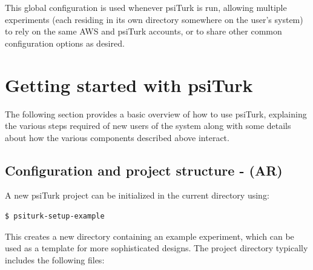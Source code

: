 \documentclass[twocolumn]{svjour3}          %
\begin{document}
This global configuration is used whenever psiTurk is run, allowing multiple experiments (each residing in its own directory somewhere on the user's system) to rely on the same AWS and psiTurk accounts, or to share other common configuration options as desired.



\section{Getting started with \textsf{psiTurk}}

The following section provides a basic overview of how to use psiTurk,
explaining the various steps required of new users of the system along with
some details about how the various components described above interact.

\subsection{Configuration and project structure - (AR)}

A new \textsf{psiTurk} project can be initialized in the current directory using:

\begin{lstlisting}
$ psiturk-setup-example
\end{lstlisting}

\noindent This creates a new directory containing an example experiment,
which can be used as a template for more sophisticated designs.
The project directory typically includes the following files: 
\end{document}
